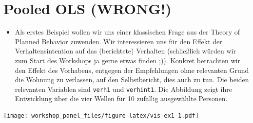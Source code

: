 \documentclass[]{book}
\newenvironment{Shaded}{\begin{snugshade}}{\end{snugshade}}
\newcommand{\DataTypeTok}[1]{\textcolor[rgb]{0.13,0.29,0.53}{#1}}
\newcommand{\DecValTok}[1]{\textcolor[rgb]{0.00,0.00,0.81}{#1}}
\newcommand{\FloatTok}[1]{\textcolor[rgb]{0.00,0.00,0.81}{#1}}
\newcommand{\KeywordTok}[1]{\textcolor[rgb]{0.13,0.29,0.53}{\textbf{#1}}}
\newcommand{\NormalTok}[1]{#1}
\newcommand{\OperatorTok}[1]{\textcolor[rgb]{0.81,0.36,0.00}{\textbf{#1}}}
\newcommand{\OtherTok}[1]{\textcolor[rgb]{0.56,0.35,0.01}{#1}}
\newcommand{\StringTok}[1]{\textcolor[rgb]{0.31,0.60,0.02}{#1}}
\providecommand{\tightlist}{%
  \setlength{\itemsep}{0pt}\setlength{\parskip}{0pt}}
\begin{document}
\hypertarget{pooled-ols-wrong}{%
\section{Pooled OLS (WRONG!)}\label{pooled-ols-wrong}}

\begin{itemize}
\tightlist
\item
  Als erstes Beispiel wollen wir uns einer klassischen Frage aus der Theory of Planned Behavior zuwenden. Wir interessieren uns für den Effekt der Verhaltensintention auf das (berichtete) Verhalten (schließlich würden wir zum Start des Workshops ja gerne etwas finden ;)). Konkret betrachten wir den Effekt des Vorhabens, entgegen der Empfehlungen ohne relevanten Grund die Wohnung zu verlassen, auf den Selbstbericht, dies auch zu tun. Die beiden relevanten Variablen sind \texttt{verh1} und \texttt{verhint1}. Die Abbildung zeigt ihre Entwicklung über die vier Wellen für 10 zufällig ausgewählte Personen.
\end{itemize}

\begin{Shaded}
\end{Shaded}

\texttt{[image: workshop\_panel\_files/figure-latex/vis-ex1-1.pdf]}
\end{document}
